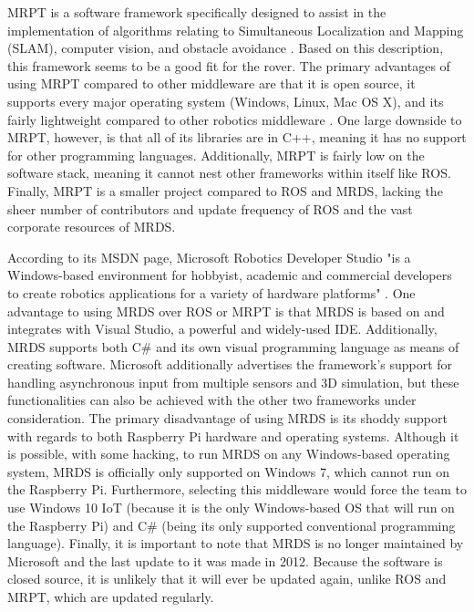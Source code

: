 \documentclass[onecolumn, draftclsnofoot,10pt, compsoc]{IEEEtran}
\begin{document}
MRPT is a software framework specifically designed to assist in the implementation of algorithms relating to Simultaneous Localization and Mapping (SLAM), computer vision, and obstacle avoidance \cite{MRPT}. Based on this description, this framework seems to be a good fit for the rover. The primary advantages of using MRPT compared to other middleware are that it is open source, it supports every major operating system (Windows, Linux, Mac OS X), and its fairly lightweight compared to other robotics middleware \cite{MRPT}. One large downside to MRPT, however, is that all of its libraries are in C++, meaning it has no support for other programming languages. Additionally, MRPT is fairly low on the software stack, meaning it cannot nest other frameworks within itself like ROS. Finally, MRPT is a smaller project compared to ROS and MRDS, lacking the sheer number of contributors and update frequency of ROS and the vast corporate resources of MRDS.

According to its MSDN page, Microsoft Robotics Developer Studio "is a Windows-based environment for hobbyist, academic and commercial developers to create robotics applications for a variety of hardware platforms" \cite{MRDS}. One advantage to using MRDS over ROS or MRPT is that MRDS is based on and integrates with Visual Studio, a powerful and widely-used IDE. Additionally, MRDS supports both C\# and its own visual programming language as means of creating software. Microsoft additionally advertises the framework's support for handling asynchronous input from multiple sensors and 3D simulation, but these functionalities can also be achieved with the other two frameworks under consideration. The primary disadvantage of using MRDS is its shoddy support with regards to both Raspberry Pi hardware and operating systems. Although it is possible, with some hacking, to run MRDS on any Windows-based operating system, MRDS is officially only supported on Windows 7, which cannot run on the Raspberry Pi. Furthermore, selecting this middleware would force the team to use Windows 10 IoT (because it is the only Windows-based OS that will run on the Raspberry Pi) and C\# (being its only supported conventional programming language). Finally, it is important to note that MRDS is no longer maintained by Microsoft and the last update to it was made in 2012. Because the software is closed source, it is unlikely that it will ever be updated again, unlike ROS and MRPT, which are updated regularly.
\end{document}
